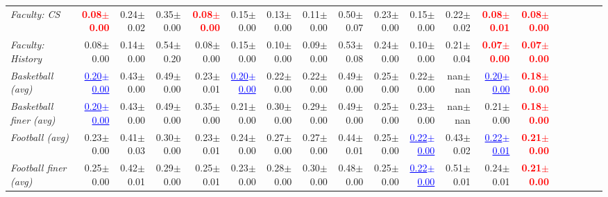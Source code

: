 \documentclass[nohyperref]{article}
\theoremstyle{plain}
\theoremstyle{definition}
\theoremstyle{remark}
\newcommand{\red}[1]{\textcolor{red}{\textbf{#1}}}
\newcommand{\blue}[1]{\textcolor{blue}{\underline{#1}}}
\begin{document}
\begin{table*}[!tb]
{\begin{tabular}{lrrrrrrrrrrrrrrrrrr}
			{\it Faculty: CS} & \red{0.08$\pm$0.00} & 0.24$\pm$0.02 & 0.35$\pm$0.00 & \red{0.08$\pm$0.00} & 0.15$\pm$0.00 & 0.13$\pm$0.00 & 0.11$\pm$0.00 & 0.50$\pm$0.07 & 0.23$\pm$0.00 & 0.15$\pm$0.00 & 0.22$\pm$0.02 & \red{0.08$\pm$0.01} & \red{0.08$\pm$0.00} \\
			{\it Faculty: History} & 0.08$\pm$0.00 & 0.14$\pm$0.00 & 0.54$\pm$0.20 & 0.08$\pm$0.00 & 0.15$\pm$0.00 & 0.10$\pm$0.00 & 0.09$\pm$0.00 & 0.53$\pm$0.08 & 0.24$\pm$0.00 & 0.10$\pm$0.00 & 0.21$\pm$0.04 & \red{0.07$\pm$0.00} & \red{0.07$\pm$0.00} \\
			{\it Basketball (avg)} & \blue{0.20$\pm$0.00} & 0.43$\pm$0.00 & 0.49$\pm$0.00 & 0.23$\pm$0.01 & \blue{0.20$\pm$0.00} & 0.22$\pm$0.00 & 0.22$\pm$0.00 & 0.49$\pm$0.00 & 0.25$\pm$0.00 & 0.22$\pm$0.00 & nan$\pm$nan & \blue{0.20$\pm$0.00} & \red{0.18$\pm$0.00} \\
			{\it Basketball finer (avg)} & \blue{0.20$\pm$0.00} & 0.43$\pm$0.00 & 0.49$\pm$0.00 & 0.35$\pm$0.00 & 0.21$\pm$0.00 & 0.30$\pm$0.00 & 0.29$\pm$0.00 & 0.49$\pm$0.00 & 0.25$\pm$0.00 & 0.23$\pm$0.00 & nan$\pm$nan & 0.21$\pm$0.00 & \red{0.18$\pm$0.00} \\
			{\it Football (avg)} & 0.23$\pm$0.00 & 0.41$\pm$0.03 & 0.30$\pm$0.00 & 0.23$\pm$0.01 & 0.24$\pm$0.00 & 0.27$\pm$0.00 & 0.27$\pm$0.00 & 0.44$\pm$0.01 & 0.25$\pm$0.00 & \blue{0.22$\pm$0.00} & 0.43$\pm$0.02 & \blue{0.22$\pm$0.01} & \red{0.21$\pm$0.00} \\
			{\it Football finer (avg)} & 0.25$\pm$0.00 & 0.42$\pm$0.01 & 0.29$\pm$0.00 & 0.25$\pm$0.01 & 0.23$\pm$0.00 & 0.28$\pm$0.00 & 0.30$\pm$0.00 & 0.48$\pm$0.00 & 0.25$\pm$0.00 & \blue{0.22$\pm$0.00} & 0.51$\pm$0.01 & 0.24$\pm$0.01 & \red{0.21$\pm$0.00} \\

\bottomrule
\end{tabular}}
\end{table*}
\end{document}
